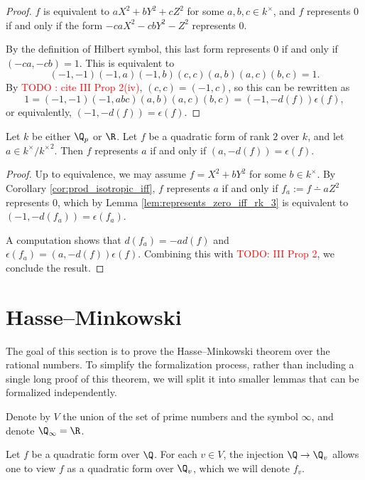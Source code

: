\begin{proof}
$f$ is equivalent to $aX^2 + bY^2 + cZ^2$ for some $a, b, c \in k^\times$, and $f$ represents $0$ if and only if the form $-caX^2 -cbY^2 - Z^2$ represents $0$.

By the definition of Hilbert symbol, this last form represents $0$ if and only if $(-ca, -cb) = 1$.
This is equivalent to
\[ (-1, -1)(-1, a)(-1, b)(c, c)(a, b)(a, c)(b, c) = 1. \]
By \textcolor{red}{TODO : cite III Prop 2(iv)}, $(c, c) = (-1, c)$, so this can be rewritten as 
\[ 1 = (-1, -1)(-1, abc)(a, b)(a, c)(b, c) = (-1, -d(f))\epsilon(f), \]
or equivalently, $(-1, -d(f)) = \epsilon(f)$.
\end{proof}

\begin{lemma}\label{lem:represents_iff_rk_2}
\leanok
{}
Let $k$ be either $\Q_p$ or $\R$. Let $f$ be a quadratic form of rank $2$ over $k$, and let $a \in k^\times / {k^\times}^2$. Then $f$ represents $a$ if and only if $(a, -d(f)) = \epsilon(f)$.
\end{lemma}
\begin{proof}
Up to equivalence, we may assume $f = X^2 + bY^2$ for some $b \in k^\times$. By Corollary \ref{cor:prod_isotropic_iff}, $f$ represents $a$ if and only if $f_a := f \dotminus aZ^2$ represents $0$, which by Lemma \ref{lem:represents_zero_iff_rk_3} is equivalent to $(-1, -d(f_a)) = \epsilon(f_a)$.

A computation shows that $d(f_a) = -a d(f)$ and $\epsilon(f_a) = (a, -d(f)) \epsilon (f)$. Combining this with \textcolor{red}{TODO: III Prop 2}, we conclude the result.
\end{proof}

\section{Hasse--Minkowski}\label{sec:Hasse--Minkowski}

The goal of this section is to prove the Hasse--Minkowski theorem over the rational numbers. To simplify the formalization process, rather than including a single long proof of this theorem, we will split it into smaller lemmas that can be formalized independently.

Denote by $V$ the union of the set of prime numbers and the symbol $\infty$, and denote $\Q_\infty = \R$. 

Let $f$ be a quadratic form over $\Q$. For each $v \in V$, the injection $\Q \to \Q_v$ allows one to view $f$ as a quadratic form over $\Q_v$, which we will denote $f_v$.

